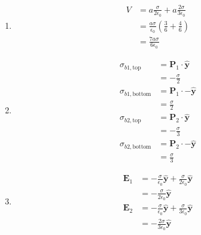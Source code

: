 \documentclass{article}
\renewcommand{\vec}[1]{\boldsymbol{\mathbf{#1}}}
\newcommand{\uvec}[1]{\hat{\vec{#1}}}
\begin{document}
\begin{enumerate}
  \item

        \begin{align*}
          V & = a \frac{\sigma}{2 \epsilon_0} + a \frac{2 \sigma}{3 \epsilon_0}      \\
            & = \frac{a \sigma}{\epsilon_0} \left( \frac{3}{6} + \frac{4}{6} \right) \\
            & = \frac{7 a \sigma}{6 \epsilon_0}
        \end{align*}

  \item

        \begin{align*}
          \sigma_{b1,\text{top}}    & = \vec{P}_1 \cdot \uvec{y}  \\
                                    & = -\frac{\sigma}{2}         \\
          \sigma_{b1,\text{bottom}} & = \vec{P}_1 \cdot -\uvec{y} \\
                                    & = \frac{\sigma}{2}          \\
          \sigma_{b2,\text{top}}    & = \vec{P}_2 \cdot \uvec{y}  \\
                                    & = -\frac{\sigma}{3}         \\
          \sigma_{b2,\text{bottom}} & = \vec{P}_2 \cdot -\uvec{y} \\
                                    & = \frac{\sigma}{3}
        \end{align*}

  \item

        \begin{align*}
          \vec{E}_1 & = -\frac{\sigma}{\epsilon_0} \uvec{y} + \frac{\sigma}{2 \epsilon_0} \uvec{y} \\
                    & = -\frac{\sigma}{2 \epsilon_0} \uvec{y}                                      \\
          \vec{E}_2 & = -\frac{\sigma}{\epsilon_0} \uvec{y} + \frac{\sigma}{3 \epsilon_0} \uvec{y} \\
                    & = -\frac{2 \sigma}{3 \epsilon_0} \uvec{y}
        \end{align*}
\end{enumerate}

\subsection{}
\end{document}

